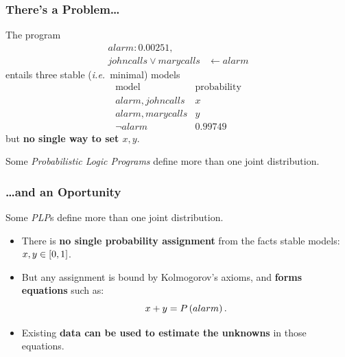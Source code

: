 \documentclass[bigger,xcolor={x11names,svgnames}]{beamer}
\begin{document}
\begin{frame}
    \frametitle{There's a Problem\ldots}
    \vfill
    The program
    $$
        \begin{aligned}
            alarm:0.00251,           &                  \\
            johncalls \vee marycalls & \leftarrow alarm
        \end{aligned}
    $$
    entails three \alert{stable}  (\emph{i.e.}\ minimal) models
    $$
        \begin{array}{r|l}
            \text{model}     & \text{probability} \\
            \hline
            alarm, johncalls & x                  \\
            alarm, marycalls & y                  \\
            \neg alarm       & 0.99749
        \end{array}
    $$
    but \textbf{no single way to set $x,y$}.
    \vfill
    \begin{center}
        Some \emph{Probabilistic Logic Programs} define more than one joint distribution.
    \end{center}
\end{frame}
%
\begin{frame}
    \frametitle{\ldots and an Oportunity}
    \begin{center}
        Some \emph{PLP}s define more than one joint distribution.
    \end{center}
    \vfill
    \begin{itemize}
        \item There is \textbf{no single probability assignment} from the facts stable models: $x,y \in \intcc{0,1}$.
        \item But any assignment is bound by Kolmogorov's axioms, and \textbf{forms equations} such as:
              $$x + y = P\del{alarm}.$$
        \item Existing \textbf{data can be used to estimate the unknowns} in those equations.
    \end{itemize}
    \vfill
\end{frame}
\end{document}
